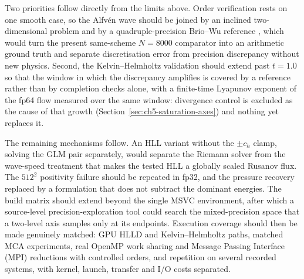Two priorities follow directly from the limits above. Order verification rests
on one smooth case, so the Alfv\'en wave should be joined by an inclined
two-dimensional problem and by a quadruple-precision Brio--Wu reference
\citep{maddock_boost_multiprecision}, which would turn the present same-scheme
$N=8000$ comparator into an arithmetic ground truth and separate discretisation
error from precision discrepancy without new physics. Second, the
Kelvin--Helmholtz validation should extend past $t=1.0$ so that the window in
which the discrepancy amplifies is covered by a reference rather than by
completion checks alone, with a finite-time Lyapunov exponent of the fp64 flow
measured over the same window: divergence control is excluded as the cause of
that growth (Section~\ref{sec:ch5-saturation-axes}) and nothing yet replaces it.

The remaining mechanisms follow. An HLL variant without the $\pm c_h$ clamp,
solving the GLM pair separately, would separate the Riemann solver from the
wave-speed treatment that makes the tested HLL a globally scaled Rusanov flux.
The $512^2$ positivity failure should be repeated in fp32, and the pressure
recovery replaced by a formulation that does not subtract the dominant energies.
The build matrix should extend beyond the single MSVC environment, after which a
source-level precision-exploration tool \citep{hoeroldEtAl2025raptor} could
search the mixed-precision space that a two-level axis samples only at its
endpoints. Execution coverage should then be made genuinely matched: GPU HLLD
and Kelvin--Helmholtz paths, matched MCA experiments, real OpenMP work sharing
and Message Passing Interface (MPI) reductions with controlled orders, and
repetition on several recorded systems, with kernel, launch, transfer and I/O
costs separated.
